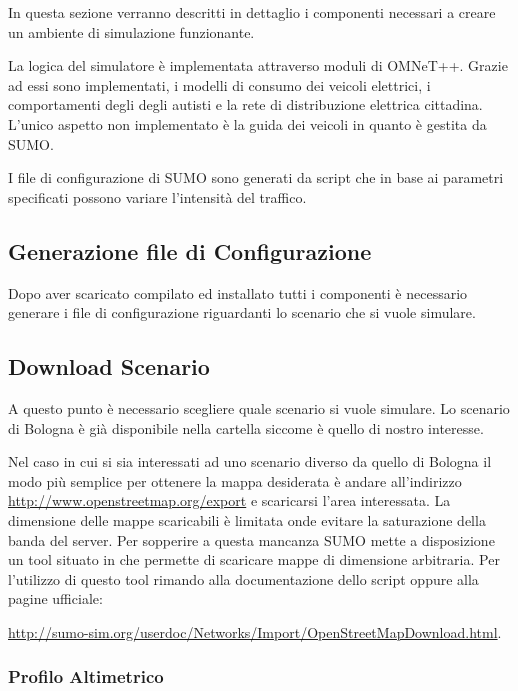 In questa sezione verranno descritti in dettaglio i componenti necessari a creare un ambiente di simulazione funzionante.

La logica del simulatore è implementata attraverso moduli di OMNeT++. Grazie ad essi sono implementati, i modelli di consumo dei veicoli elettrici, i comportamenti degli degli autisti e la rete di distribuzione elettrica cittadina. L'unico aspetto non implementato è la guida dei veicoli in quanto è gestita da SUMO.

I file di configurazione di SUMO sono generati da script che in base ai parametri specificati possono variare l'intensità del traffico.


\subsection{Generazione file di Configurazione}

Dopo aver scaricato compilato ed installato tutti i componenti è necessario generare i file di configurazione riguardanti lo scenario che si vuole simulare. 

\subsection{Download Scenario}

A questo punto è necessario scegliere quale scenario si vuole simulare. Lo scenario di Bologna è già disponibile nella cartella  siccome è quello di nostro interesse.

Nel caso in cui si sia interessati ad uno scenario diverso da quello di Bologna il modo più semplice per ottenere la mappa desiderata è andare all'indirizzo \url{http://www.openstreetmap.org/export} e scaricarsi l'area interessata. La dimensione delle mappe scaricabili è limitata onde evitare la saturazione della banda del server. Per sopperire a questa mancanza SUMO mette a disposizione un tool situato in  che permette di scaricare mappe di dimensione arbitraria. Per l'utilizzo di questo tool rimando alla documentazione dello script oppure alla pagine ufficiale:

\url{http://sumo-sim.org/userdoc/Networks/Import/OpenStreetMapDownload.html}.

\subsubsection{Profilo Altimetrico}\label{profilo-altimetrico}

